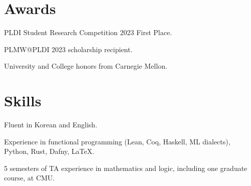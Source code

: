 \documentclass[12pt]{article}
\begin{document}
\section{Awards}

PLDI Student Research Competition 2023 First Place.

PLMW@PLDI 2023 scholarship recipient.

University and College honors from Carnegie Mellon.

\section{Skills}

Fluent in Korean and English.

Experience in functional programming (Lean, Coq, Haskell, ML dialects), Python, Rust, Dafny, LaTeX.

5 semesters of TA experience in mathematics and logic, including one graduate course, at CMU.
\end{document}
